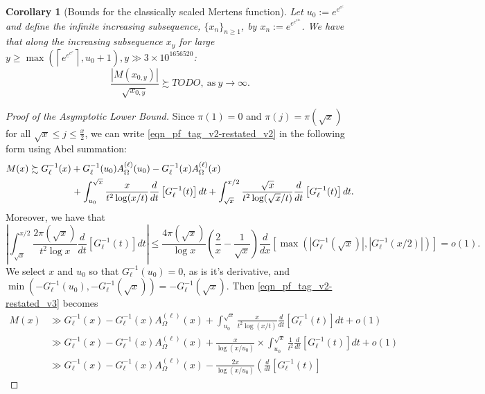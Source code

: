 \documentclass[11pt,reqno,a4letter]{article}
\numberwithin{figure}{section}
\numberwithin{table}{section}
\newcommand{\ceiling}[1]{\left\lceil #1 \right\rceil}
\theoremstyle{plain}
\newtheorem{cor}[theorem]{Corollary}
\numberwithin{theorem}{section}
\theoremstyle{definition}
\begin{document}
\begin{cor}[Bounds for the classically scaled Mertens function] 
Let $u_0 := e^{e^{e^{e}}}$ and define the infinite increasing subsequence, 
$\{x_n\}_{n \geq 1}$, by $x_n := e^{e^{e^{e^{2n}}}}$. 
We have that along the increasing subsequence $x_y$ for large 
$y \geq \max\left(\ceiling{e^{e^{e^{e}}}}, u_0+1\right), y \gg 3 \times 10^{1656520}$:  
\[
\frac{|M(x_{0,y})|}{\sqrt{x_{0,y}}} \succsim TODO, \mathrm{\ as\ } y \rightarrow \infty. 
\]
\end{cor} 
\begin{proof}[Proof of the Asymptotic Lower Bound] 
Since $\pi(1) = 0$ and $\pi(j) = \pi(\sqrt{x})$ for all $\sqrt{x} \leq j \leq \frac{x}{2}$, 
we can write \eqref{eqn_pf_tag_v2-restated_v2} in the following form using Abel summation: 
\begin{align} 
\label{eqn_pf_tag_v2-restated_v3} 
M(x) & \succsim G_{\ell}^{-1}(x) + G_{\ell}^{-1}(u_0) A_{\Omega}^{(\ell)}(u_0) - 
      G_{\ell}^{-1}(x) A_{\Omega}^{(\ell)}(x) \\ 
\notag 
      & \phantom{\succsim G_{ell}^{-1}(x)\ } + 
      \int_{u_0}^{\sqrt{x}} 
      \frac{x}{t^2 \log(x/t)} \frac{d}{dt}\left[G_{\ell}^{-1}(t)\right] dt + 
      \int_{\sqrt{x}}^{x/2} 
      \frac{\sqrt{x}}{t^2 \log(\sqrt{x}/t)} \frac{d}{dt}\left[G_{\ell}^{-1}(t)\right] dt. 
\end{align} 
Moreover, we have that 
\[
\left\lvert \int_{\sqrt{x}}^{x/2} \frac{2\pi(\sqrt{x})}{t^2 \log x} 
     \frac{d}{dt}\left[G_{\ell}^{-1}(t)\right] dt \right\rvert \leq 
     \frac{4 \pi(\sqrt{x})}{\log x} \left(\frac{2}{x} - \frac{1}{\sqrt{x}}\right) 
     \frac{d}{dx}\left[\max\left(|G_{\ell}^{-1}(\sqrt{x})|, |G_{\ell}^{-1}(x/2)|\right)\right] 
     = o(1). 
\]
We select $x$ and $u_0$ so that $G_{\ell}^{-1}(u_0) = 0$, as is it's derivative, and 
$\min(-G_{\ell}^{-1}(u_0), -G_{\ell}^{-1}(\sqrt{x})) = -G_{\ell}^{-1}(\sqrt{x})$. 
Then \eqref{eqn_pf_tag_v2-restated_v3} becomes 
\begin{align*} 
M(x) & \gg G_{\ell}^{-1}(x) - G_{\ell}^{-1}(x) A_{\Omega}^{(\ell)}(x) + \int_{u_0}^{\sqrt{x}} 
      \frac{x}{t^2 \log(x/t)} \frac{d}{dt}\left[G_{\ell}^{-1}(t)\right] dt + o(1) \\ 
     & \gg G_{\ell}^{-1}(x) - G_{\ell}^{-1}(x) A_{\Omega}^{(\ell)}(x) + 
     \frac{x}{\log(x/u_0)} \times \int_{u_0}^{\sqrt{x}} 
     \frac{1}{t^2} \frac{d}{dt}\left[G_{\ell}^{-1}(t)\right] dt + o(1) \\ 
     & \gg G_{\ell}^{-1}(x) - G_{\ell}^{-1}(x) A_{\Omega}^{(\ell)}(x) 
     -\frac{2 x}{\log(x/u_0)} \left(\frac{d}{dt}\left[G_{\ell}^{-1}(t)\right] 

\end{align*}
\end{proof}
\end{document}

